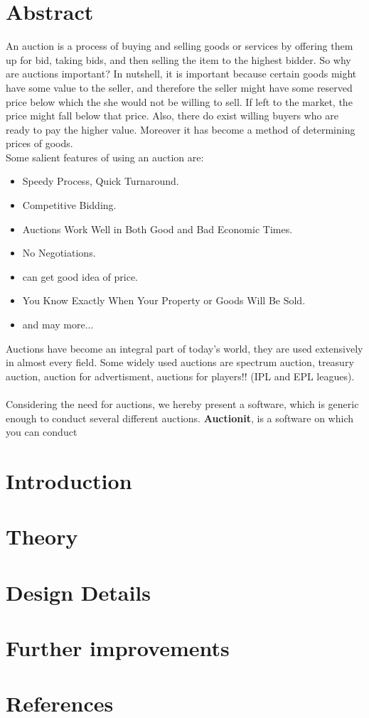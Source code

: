 \documentclass[a4paper]{article}
\begin{document}

\section*{Abstract}
An auction is a process of buying and selling goods or services by offering them up for bid, 
taking bids, and then selling the item to the highest bidder. 
So why are auctions important? In nutshell, it is important because certain goods might have some value to the seller,
and therefore the seller might have some reserved price below which the she would not be willing to sell.
If left to the market, the price might fall below that price.
Also, there do exist willing buyers who are ready to pay the higher value.
Moreover it has become a method of determining prices of goods. \\
Some salient features of using an auction are:
\begin{itemize}
	\item Speedy Process, Quick Turnaround.
	\item Competitive Bidding.
	\item Auctions Work Well in Both Good and Bad Economic Times.
	\item No Negotiations.
	\item can get good idea of price.
	\item You Know Exactly When Your Property or Goods Will Be Sold.
	\item and may more...
\end{itemize}
Auctions have become an integral part of today's world, they are used extensively in almost every field. Some widely used auctions are spectrum auction, treasury auction, auction for advertisment, auctions for players!! (IPL and EPL leagues). \\ \\
Considering the need for auctions, we hereby present a software, which is generic enough to conduct several different auctions. \textbf{Auctionit}, is a software on which you can conduct 









\section*{Introduction}

\section*{Theory}

\section*{Design Details}

\section*{Further improvements}

\section*{References}
\end{document}
